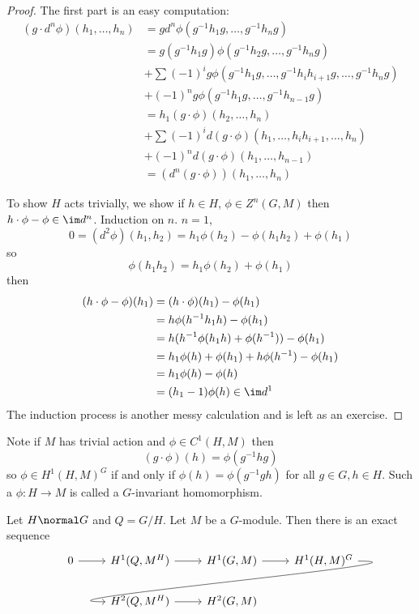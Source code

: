 \documentclass[a4paper]{article}
\begin{document}
\begin{proof}
  The first part is an easy computation:
  \begin{align*}
    (g \cdot d^n \phi)(h_1, \dots, h_n)
    &= g d^n\phi(g^{-1}h_1g, \dots, g^{-1}h_ng) \\
    &= g(g^{-1}h_1g) \phi(g^{-1}h_2g, \dots, g^{-1}h_ng) \\
    &+ \sum (-1)^i g \phi(g^{-1}h_1g, \dots, g^{-1} h_ih_{i + 1} g, \dots, g^{-1} h_n g) \\
    &+ (-1)^n g \phi(g^{-1}h_1g, \dots, g^{-1}h_{n - 1}g) \\
    &= h_1 (g \cdot \phi)(h_2, \dots, h_n) \\
    &+ \sum (-1)^i d (g \cdot \phi) (h_1, \dots, h_i h_{i + 1}, \dots, h_n) \\
    &+ (-1)^n d(g \cdot \phi) (h_1, \dots, h_{n - 1}) \\
    &= (d^n(g \cdot \phi))(h_1, \dots, h_n)
  \end{align*}
  
  To show \(H\) acts trivially, we show if \(h \in H\), \(\phi \in Z^n(G, M)\) then \(h \cdot \phi - \phi \in \im d^n\). Induction on \(n\). \(n = 1\),
  \[
    0 = (d^2 \phi)(h_1, h_2) = h_1\phi(h_2) - \phi(h_1h_2) + \phi(h_1)
  \]
  so
  \[
    \phi(h_1h_2) = h_1\phi(h_2) + \phi(h_1)
  \]
  then
  \begin{align*}
    (h \cdot \phi - \phi)(h_1)
    &= (h \cdot \phi)(h_1) - \phi(h_1) \\
    &= h \phi(h^{-1}h_1h) - \phi(h_1) \\
    &= h(h^{-1} \phi(h_1h) + \phi(h^{-1})) - \phi(h_1) \\
    &= h_1\phi(h) + \phi(h_1) + h\phi(h^{-1}) - \phi(h_1) \\
    &= h_1\phi(h) - \phi(h) \\
    &= (h_1 - 1) \phi(h) \in \im d^1
  \end{align*}
  The induction process is another messy calculation and is left as an exercise.
\end{proof}

Note if \(M\) has trivial action and \(\phi \in C^1(H, M)\) then
\[
  (g \cdot \phi)(h) = \phi(g^{-1}hg)
\]
so \(\phi \in H^1(H, M)^G\) if and only if \(\phi(h) = \phi(g^{-1}gh)\) for all \(g \in G, h \in H\). Such a \(\phi: H \to M\) is called a \(G\)-invariant homomorphism.

\begin{theorem}
  Let \(H \normal G\) and \(Q = G/H\). Let \(M\) be a \(G\)-module. Then there is an exact sequence
  \[
    \begin{tikzcd}
      0 \ar[r] & H^1(Q, M^H) \ar[r] & H^1(G, M) \ar[r] & H^1(H, M)^G \ar[dll, out=0, in=180, overlay] \\
      & H^2(Q, M^H) \ar[r] & H^2(G, M)
    \end{tikzcd}
  \]
\end{theorem}
\end{document}
